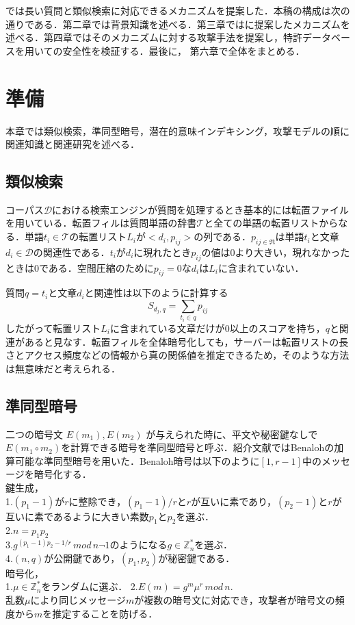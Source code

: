 \documentclass{jsarticle}
\theoremstyle{definition}
\begin{document}
\cite{pang_embellishing_2010}では長い質問と類似検索に対応できるメカニズムを提案した．本稿の構成は次の通りである．第二章では背景知識を述べる．第三章では\cite{pang_embellishing_2010}に提案したメカニズムを述べる．第四章ではそのメカニズムに対する攻撃手法を提案し，特許データベースを用いて\cite{pang_embellishing_2010}の安全性を検証する．最後に， 第六章で全体をまとめる．


\section{準備}
本章では類似検索，準同型暗号，潜在的意味インデキシング，攻撃モデルの順に関連知識と関連研究を述べる．

\subsection{類似検索}
コーパス$\mathcal{D}$における検索エンジンが質問を処理するとき基本的には転置ファイルを用いている．転置フィルは質問単語の辞書$\mathcal{T}$と全ての単語の転置リストからなる．単語$t_i \in \mathcal{T}$の転置リスト$L_i$が$<d_i,p_{ij}>$の列である．$p_{ij \in \Re}$は単語$t_i$と文章$d_i \in \mathcal{D}$の関連性である．$t_i$が$d_i$に現れたとき$p_{ij}$の値は$0$より大きい，現れなかったときは$0$である．空間圧縮のために$p_{ij}=0$な$d_i$は$L_i$に含まれていない．

質問$q={t_i}$と文章$d_i$と関連性は以下のように計算する
\begin{equation}
S_{d_j,q} = \sum_{t_i \in q}p_{ij}
\end{equation}
したがって転置リスト$L_i$に含まれている文章だけが$0$以上のスコアを持ち，$q$と関連があると見なす．転置フィルを全体暗号化しても，サーバーは転置リストの長さとアクセス頻度などの情報から真の関係値を推定できるため，そのような方法は無意味だと考えられる．

\subsection{準同型暗号}\label{enc}
二つの暗号文 $E(m_1), E(m_2)$ が与えられた時に、平文や秘密鍵なしで $E( m_1 \circ m_2 )$を計算できる暗号を準同型暗号と呼ぶ．紹介文献ではBenalohの加算可能な準同型暗号\cite{benaloh_dense_1994}を用いた．Benaloh暗号は以下のように$[1,r-1]$中のメッセージを暗号化する．\\
鍵生成，\\
1.$(p_1-1)$が$r$に整除でき，$(p_1-1)/r$と$r$が互いに素であり，$(p_2-1)$と$r$が互いに素であるように大きい素数$p_1$と$p_2$を選ぶ．\\
2.$n = p_1p_2$\\
3.$g^{(p_1-1){p_2-1}/r} \, mod \, n \neg 1$のようになる$g \in \mathbb{Z}^*_n$を選ぶ．\\
4.$(n,q)$が公開鍵であり，$(p_1,p_2)$が秘密鍵である．\\
暗号化，\\
1.$\mu \in \mathbb{Z}^*_n$をランダムに選ぶ．
2.$E(m) = g^m\mu^r \, mod \, n$.\\
乱数$\mu$により同じメッセージ$m$が複数の暗号文に対応でき，攻撃者が暗号文の頻度から$m$を推定することを防げる．
\end{document}

